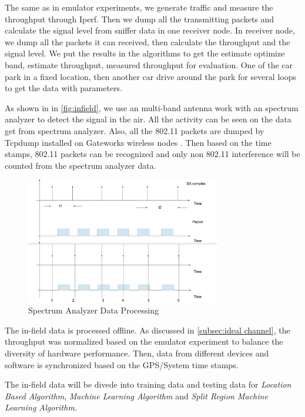 The same as in emulator experiments, we generate traffic and measure the throughput through Iperf. Then we dump all the transmitting packets and calculate the signal level from sniffer data in one receiver node. 
In receiver node, we dump all the packets it can received, then calculate the throughput and the signal level. We put the results in the algorithms to get the estimate optimize band, estimate throughput, measured throughput for evaluation.
One of the car park in a fixed location, then another car drive around the park for several loops to get the data with parameters. 

As shown in in \ref{fig:infield}, we use an multi-band antenna work with an spectrum analyzer to detect the signal in the air. All the activity can be seen on the data get from spectrum analyzer.
Also, all the 802.11 packets are dumped by Tcpdump installed on Gateworks wireless nodes \cite{jacobson1989tcpdump}. Then based on the time stamps, 802.11 packets can be recognized and only non 802.11 interference will be counted from the spectrum analyzer data.  

\begin{figure}
\centering
\includegraphics[width=85mm]{figure/sa_process}
\caption{Spectrum Analyzer Data Processing}
\label{fig:sa_process}
\end{figure}


The in-field data is processed offline. As discussed in \ref{subsec:ideal channel}, the throughput was normalized based on the emulator experiment to balance the diversity of hardware performance. Then, data from different devices and software is synchronized based on the GPS/System time stamps.

The in-field data will be divede into training data and testing data for \emph{Location Based Algorithm}, \emph{Machine Learning Algorithm} and \emph{Split Region Machine Learning Algorithm}.


